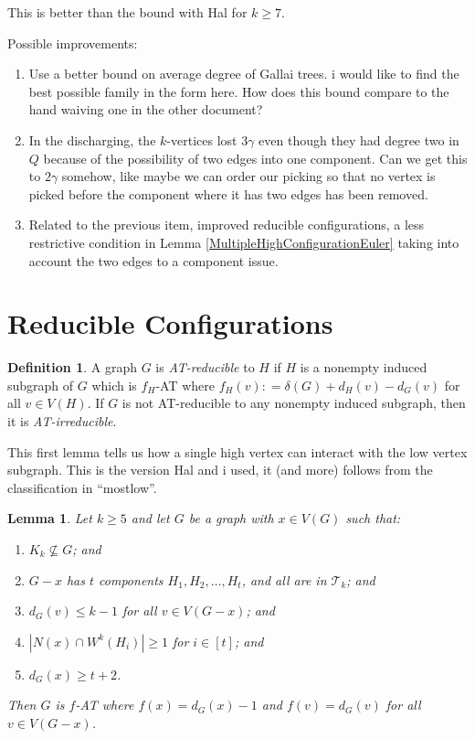 \documentclass[12pt]{article}
\theoremstyle{plain}
\newtheorem{lem}[thm]{Lemma}
\theoremstyle{definition}
\newtheorem{defn}{Definition}
\theoremstyle{remark}
\newcommand{\fancy}[1]{\mathcal{#1}}
\newcommand{\T}{\fancy{T}}
\newcommand{\card}[1]{\left|#1\right|}
\newcommand{\irange}[1]{\left[#1\right]}
\newcommand{\DefinedAs}{\mathrel{\mathop:}=}
\begin{document}
This is better than the bound with Hal for $k \ge 7$.  



Possible improvements:

\begin{enumerate}
	\item Use a better bound on average degree of Gallai trees.  i would like to find the best possible family in the form here.  How does this bound compare to the hand waiving one in the other document?
	\item In the discharging, the $k$-vertices lost $3\gamma$ even though they had degree two in $Q$ because of the possibility of two edges into one component.  Can we get this to $2\gamma$ somehow, like maybe we can order our picking so that no vertex is picked before the component where it has two edges has been removed.   
	\item Related to the previous item, improved reducible configurations, a less restrictive condition in Lemma \ref{MultipleHighConfigurationEuler} taking into account the two edges to a component issue.
\end{enumerate}

\section{Reducible Configurations}
\begin{defn}
	A graph $G$ is \emph{AT-reducible} to $H$ if $H$ is a nonempty induced subgraph of $G$ which is $f_H$-AT where $f_H(v) \DefinedAs \delta(G) + d_H(v) - d_G(v)$ for all $v \in V(H)$.  
	If $G$ is not AT-reducible to any nonempty induced subgraph, then it is \emph{AT-irreducible}.
\end{defn}

This first lemma tells us how a single high vertex can interact with the low vertex subgraph.  This is the version Hal and i used, it (and more) follows from the classification in ``mostlow''.

\begin{lem}\label{ConfigurationTypeOneEuler}
Let $k \ge 5$ and let $G$ be a graph with $x \in V(G)$ such that:
\begin{enumerate}
\item $K_k \not \subseteq G$; and
\item $G-x$ has $t$ components $H_1, H_2, \ldots, H_t$, and all are in $\T_k$; and
\item $d_G(v) \leq k - 1$ for all $v \in V(G-x)$; and
\item $\card{N(x) \cap W^k(H_i)} \ge 1$ for $i \in \irange{t}$; and
\item $d_G(x) \ge t+2$.
\end{enumerate}

\noindent Then $G$ is $f$-AT where $f(x) = d_G(x) - 1$ and $f(v) = d_G(v)$ for all $v \in V(G - x)$.
\end{lem}
\end{document}
